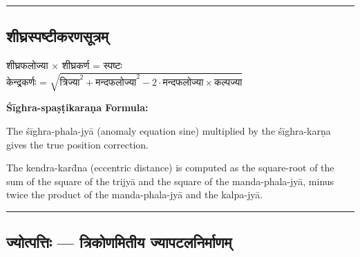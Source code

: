 \documentclass[11pt,a4paper]{article}
\newcommand{\longline}{\noindent\rule{\textwidth}{0.4pt}}
\newcommand{\dev}[1]{{\devanagarifont #1}}
\newcommand{\sectsep}{\par\vspace{0.8em}\longline\vspace{0.8em}}
\begin{document}
\sectsep

\subsection{\dev{शीघ्रस्पष्टीकरणसूत्रम्}}

\begin{minipage}[t]{0.48\textwidth}
\small\devanagarifont
शीघ्रफलोज्या $\times$ शीघ्रकर्ण = स्पष्टः\\[0.5em]
केन्‍द्रकर्णः = $\sqrt{\text{त्रिज्या}^2 + \text{मन्दफलोज्या}^2 - 2 \cdot \text{मन्दफलोज्या} \times \text{कल्पज्या}}$
\end{minipage}%
\hfill
\begin{minipage}[t]{0.48\textwidth}
\small
\textbf{\'S\=ighra-spa\d{s}\d{t}ikara\d{n}a Formula:}

The \'s\=ighra-phala-jy\=a (anomaly equation sine) multiplied by the \'s\=ighra-kar\d{n}a gives the true position correction.

The kendra-kar\=d{n}a (eccentric distance) is computed as the square-root of the sum of the square of the trijy\=a and the square of the manda-phala-jy\=a, minus twice the product of the manda-phala-jy\=a and the kalpa-jy\=a.
\end{minipage}

\sectsep

\subsection{\dev{ज्योत्पत्तिः --- त्रिकोणमितीय ज्यापटलनिर्माणम्}}
\label{subsec:jyotpatti}
\end{document}
